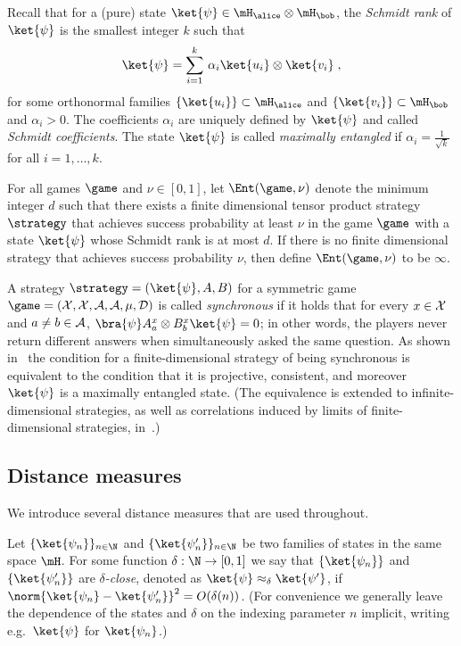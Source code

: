 Recall that for a (pure) state $\ket{\psi}\in \mH_\alice \otimes \mH_\bob$, the \emph{Schmidt rank} of $\ket{\psi}$ is the smallest integer $k$ such that 
\[ \ket{\psi} = \sum_{i=1}^k\, \alpha_i \ket{u_i}\otimes \ket{v_i}\;,\]
for some orthonormal families $\{\ket{u_i}\}\subset \mH_\alice$ and $\{\ket{v_i}\}\subset\mH_\bob$ and $\alpha_i>0$. The coefficients $\alpha_i$ are uniquely defined by $\ket{\psi}$ and called \emph{Schmidt coefficients}. The state $\ket{\psi}$ is called \emph{maximally entangled} if $\alpha_i=\frac{1}{\sqrt{k}}$ for all $i=1,\ldots,k$.  


\begin{definition}
  \label{def:ent}
	For all games $\game$ and $\nu \in [0, 1]$, let $\Ent(\game, \nu)$ denote the
  minimum integer $d$ such that there exists a finite dimensional tensor product
  strategy $\strategy$ that achieves success probability at least $\nu$ in the
  game $\game$ with a state $\ket{\psi}$ whose Schmidt rank is at most $d$.
  If there is no finite dimensional strategy that achieves success probability
  $\nu$, then define $\Ent(\game, \nu)$ to be $\infty$.
\end{definition}



\begin{remark}
  A strategy $\strategy = (\ket{\psi},A,B)$ for a symmetric game $\game =
  (\cal{X}, \cal{X}, \cal{A}, \cal{A}, \mu, D)$ is called \emph{synchronous} if
  it holds that for every $x\in \cal{X}$ and $a\neq b \in \cal{A}$, $\bra{\psi}
  A^x_a \otimes B^x_b \ket{\psi} = 0$; in other words,
  the players never return different answers when simultaneously asked the same
  question.
  As shown in~\cite{paulsen2016estimating} the condition for a
  finite-dimensional strategy of being synchronous is equivalent to the
  condition that it is projective, consistent, and moreover $\ket{\psi}$ is a
  maximally entangled state.
  (The equivalence is extended to infinite-dimensional strategies, as well as
  correlations induced by limits of finite-dimensional strategies,
  in~\cite{kim2018synchronous}.)
\end{remark}
\subsection{Distance measures}

We introduce several distance measures that are used throughout.

\begin{definition}
  \label{def:state-distance}

	Let $\{\ket{\psi_n}\}_{n\in \N}$ and $\{\ket{\psi'_n}\}_{n\in \N}$ be two
  families of states in the same space $\mH$.
  For some function $\delta : \N \to [0,1]$ we say that $\{ \ket{\psi_n} \}$ and
  $\{ \ket{\psi'_n} \}$ are \emph{$\delta$-close}, denoted as $\ket{\psi}
  \approx_\delta \ket{\psi'}$, if $ \norm{\ket{\psi_n} - \ket{\psi'_n}}^2 =
  O(\delta(n))$.
  (For convenience we generally leave the dependence of the states and $\delta$
  on the indexing parameter $n$ implicit, writing e.g.\ $\ket{\psi}$ for $\ket{\psi_n}$.)
\end{definition}

